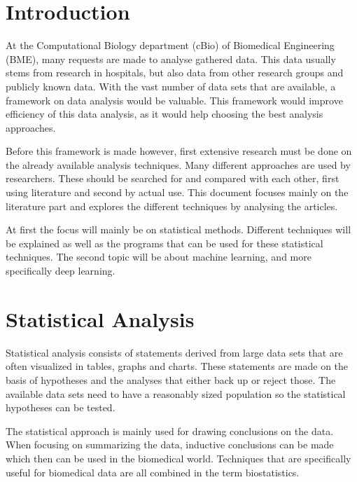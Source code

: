 \documentclass[10pt,a4paper]{report}
\begin{document}
	\section{Introduction}
	
	At the Computational Biology department (cBio) of Biomedical Engineering (BME), many requests are made to analyse gathered data. This data usually stems from research in hospitals, but also data from other research groups and publicly known data. With the vast number of data sets that are available, a framework on data analysis would be valuable. This framework would improve efficiency of this data analysis, as it would help choosing the best analysis approaches. 
	
	Before this framework is made however, first extensive research must be done on the already available analysis techniques. Many different approaches are used by researchers. These should be searched for and compared with each other, first using literature and second by actual use. This document focuses mainly on the literature part and explores the different techniques by analysing the articles.
	
	At first the focus will mainly be on statistical methods. Different 
	techniques will be explained as well as the programs that can be used for 
	these statistical techniques. The second topic will be about machine 
	learning, and more specifically deep learning. 
	
	\clearpage
	
	\section{Statistical Analysis}
	
	Statistical analysis consists of statements derived from large data sets that are often visualized in tables, graphs and charts. These statements are made on the basis of hypotheses and the analyses that either back up or reject those. The available data sets need to have a reasonably sized population so the statistical hypotheses can be tested. \cite{woolson2011statistical} 
	
	The statistical approach is mainly used for drawing conclusions on the 
	data. When focusing on summarizing the data, inductive conclusions can be 
	made which then can be used in the biomedical world. Techniques that are 
	specifically useful for biomedical data are all combined in the term 
	biostatistics. \cite{woolson2011statistical} 
	
\end{document}
